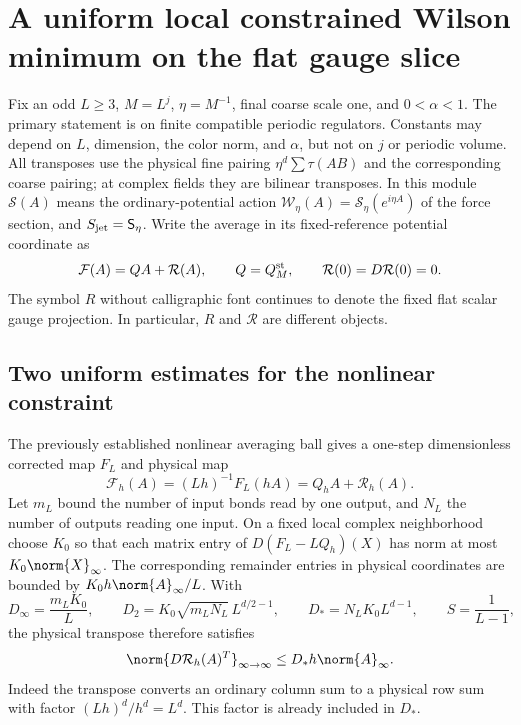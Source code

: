 
\section{A uniform local constrained Wilson minimum on the flat gauge slice}
\label{nm-section}

Fix an odd $L\ge3$, $M=L^j$, $\eta=M^{-1}$, final coarse scale one,
and $0<\alpha<1$. The primary statement is on finite compatible
periodic regulators. Constants may depend on $L$, dimension, the
color norm, and $\alpha$, but not on $j$ or periodic volume. All
transposes use the physical fine pairing $\eta^d\sum\tau(AB)$ and
the corresponding coarse pairing; at complex fields they are
bilinear transposes. In this module
$\mathcal S(A)$ means the ordinary-potential action
$\mathcal W_\eta(A)=\mathcal S_\eta(e^{i\eta A})$ of the force
section, and $S_{\rm jet}=\mathsf S_\eta$. Write the average in its
fixed-reference potential coordinate as
\begin{equation}\label{nm-average}
 \mathcal F(A)=QA+\mathcal R(A),\qquad Q=Q_M^{\rm st},\qquad
 \mathcal R(0)=D\mathcal R(0)=0.
\end{equation}
The symbol $R$ without calligraphic font continues to denote the
fixed flat scalar gauge projection. In particular, $R$ and
$\mathcal R$ are different objects.

\subsection{Two uniform estimates for the nonlinear constraint}
\label{nm-average-estimates}

The previously established nonlinear averaging ball gives a
one-step dimensionless corrected map $F_L$ and physical map
\begin{equation}\label{nm-one-step}
 \mathcal F_h(A)=(Lh)^{-1}F_L(hA)=Q_hA+\mathcal R_h(A).
\end{equation}
Let $m_L$ bound the number of input bonds read by one output, and
$N_L$ the number of outputs reading one input. On a fixed local
complex neighborhood choose $K_0$ so that each matrix entry of
$D(F_L-LQ_h)(X)$ has norm at most $K_0\norm{X}_\infty$.
The corresponding remainder entries in physical coordinates are
bounded by $K_0h\norm{A}_\infty/L$. With
\begin{equation}\label{nm-local-constants}
 D_\infty=\frac{m_LK_0}{L},\qquad
 D_2=K_0\sqrt{m_LN_L}\,L^{d/2-1},\qquad
 D_*=N_LK_0L^{d-1},\qquad S=\frac1{L-1},
\end{equation}
the physical transpose therefore satisfies
\begin{equation}\label{nm-adjoint-one-step}
 \norm{D\mathcal R_h(A)^T}_{\infty\to\infty}
 \le D_*h\norm{A}_\infty.
\end{equation}
Indeed the transpose converts an ordinary column sum to a physical
row sum with factor $(Lh)^d/h^d=L^d$. This factor is already
included in $D_*$.

